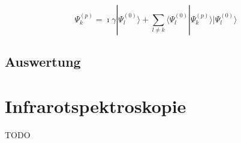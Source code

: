 \begin{refsection}
\[
\Psi_k^{(p)}
=
\imath\gamma|\Psi_l^{(0)}\rangle+
\displaystyle\sum_{l\neq k} \langle\Psi_l^{(0)}|\Psi_k^{(p)}\rangle
|\Psi_l^{(0)}\rangle
\]

\subsection{Auswertung}

\section{Infrarotspektroskopie}
TODO

\printbibliography[heading=subbibliography]
\end{refsection}

